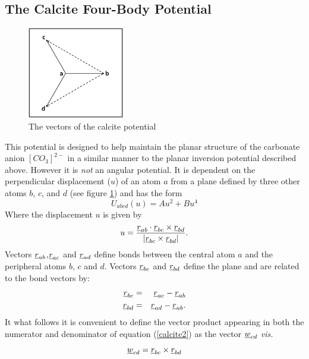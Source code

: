 \subsection{The Calcite Four-Body Potential}
\label{calcite}
\begin{figure}[ht]
\begin{center}
\includegraphics[height=4cm]{calcite.eps}
\caption{The vectors of the calcite potential}
\label{calcfig}
\end{center}
\end{figure}
 This potential \cite{rohl-03a} is designed to help
maintain the planar structure of the carbonate anion $[CO_{3}]^{2-}$ in a
similar manner to the planar inversion potential described above. However it
is {\em not} an angular potential. It is dependent on the perpendicular
displacement ($u$) of an atom $a$ from a plane defined by three other atoms
$b$, $c$, and $d$ (see figure \ref{calcfig}) and has the form
\begin{equation}
U_{abcd}(u)=Au^{2}+Bu^{4} \label{calcite1}
\end{equation}
Where the displacement $u$ is given by
\begin{equation}
u=\frac{\mbox{$\underline{r}$}_{ab}\cdot\mbox{$\underline{r}$}_{bc}\times\mbox{$\underline{r}$}_{bd}}{|\mbox{$\underline{r}$}_{bc}\times\mbox{$\underline{r}$}_{bd}|}.\label{calcite2}
\end{equation}
Vectors $\mbox{$\underline{r}$}_{ab}$,$\mbox{$\underline{r}$}_{ac}$ and $\mbox{$\underline{r}$}_{ad}$ define bonds between
the central atom $a$ and the peripheral atoms $b$, $c$ and $d$. Vectors
$\mbox{$\underline{r}$}_{bc}$ and $\mbox{$\underline{r}$}_{bd}$ define the plane and are related to the bond
vectors by:
\begin{eqnarray}
\mbox{$\underline{r}$}_{bc}&=&\mbox{$\underline{r}$}_{ac}-\mbox{$\underline{r}$}_{ab} \nonumber \\
\mbox{$\underline{r}$}_{bd}&=&\mbox{$\underline{r}$}_{ad}-\mbox{$\underline{r}$}_{ab}.
\end{eqnarray}
It what follows it is convenient to define the vector product appearing in
both the numerator and denominator of equation (\ref{calcite2}) as the vector
$\mbox{$\underline{w}$}_{cd}$ {\em vis.}
\begin{equation}
\mbox{$\underline{w}$}_{cd}=\mbox{$\underline{r}$}_{bc}\times\mbox{$\underline{r}$}_{bd}
\end{equation}
